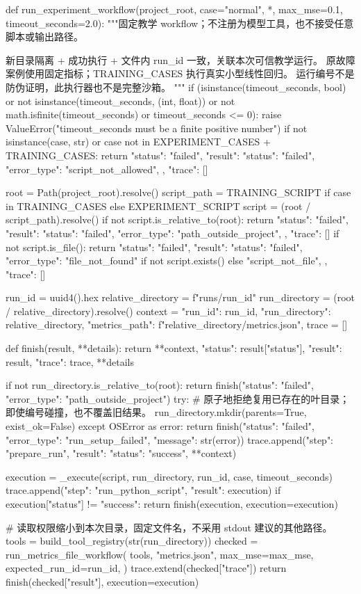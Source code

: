 \documentclass[UTF8,zihao=-4,fontset=fandol]{ctexart}
\begin{document}
\begin{Code}
def run_experiment_workflow(project_root, case="normal", *, max_mse=0.1, timeout_seconds=2.0):
    """固定教学 workflow；不注册为模型工具，也不接受任意脚本或输出路径。

    新目录隔离 + 成功执行 + 文件内 run_id 一致，关联本次可信教学运行。
    原故障案例使用固定指标；TRAINING_CASES 执行真实小型线性回归。
    运行编号不是防伪证明，此执行器也不是完整沙箱。
    """
    if (isinstance(timeout_seconds, bool) or not isinstance(timeout_seconds, (int, float))
            or not math.isfinite(timeout_seconds) or timeout_seconds <= 0):
        raise ValueError("timeout_seconds must be a finite positive number")
    if not isinstance(case, str) or case not in EXPERIMENT_CASES + TRAINING_CASES:
        return {"status": "failed", "result": {
            "status": "failed", "error_type": "script_not_allowed",
        }, "trace": []}

    root = Path(project_root).resolve()
    script_path = TRAINING_SCRIPT if case in TRAINING_CASES else EXPERIMENT_SCRIPT
    script = (root / script_path).resolve()
    if not script.is_relative_to(root):
        return {"status": "failed", "result": {
            "status": "failed", "error_type": "path_outside_project",
        }, "trace": []}
    if not script.is_file():
        return {"status": "failed", "result": {
            "status": "failed", "error_type": "file_not_found" if not script.exists() else "script_not_file",
        }, "trace": []}

    run_id = uuid4().hex
    relative_directory = f"runs/{run_id}"
    run_directory = (root / relative_directory).resolve()
    context = {
        "run_id": run_id, "run_directory": relative_directory,
        "metrics_path": f"{relative_directory}/metrics.json",
    }
    trace = []

    def finish(result, **details):
        return {**context, "status": result["status"], "result": result, "trace": trace, **details}

    if not run_directory.is_relative_to(root):
        return finish({"status": "failed", "error_type": "path_outside_project"})
    try:
        # 原子地拒绝复用已存在的叶目录；即使编号碰撞，也不覆盖旧结果。
        run_directory.mkdir(parents=True, exist_ok=False)
    except OSError as error:
        return finish({"status": "failed", "error_type": "run_setup_failed", "message": str(error)})
    trace.append({"step": "prepare_run", "result": {"status": "success", **context}})

    execution = _execute(script, run_directory, run_id, case, timeout_seconds)
    trace.append({"step": "run_python_script", "result": execution})
    if execution["status"] != "success":
        return finish(execution, execution=execution)

    # 读取权限缩小到本次目录，固定文件名，不采用 stdout 建议的其他路径。
    tools = build_tool_registry(str(run_directory))
    checked = run_metrics_file_workflow(
        tools, "metrics.json", max_mse=max_mse, expected_run_id=run_id,
    )
    trace.extend(checked["trace"])
    return finish(checked["result"], execution=execution)
\end{Code}
\end{document}
